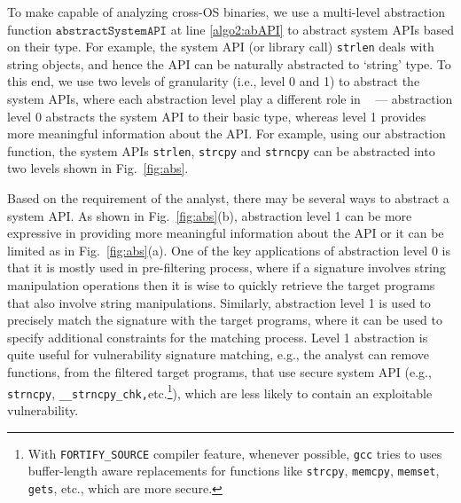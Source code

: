 To make \tool capable of analyzing cross-OS binaries, we use a multi-level abstraction function $\mathtt{abstractSystemAPI}$ at line \ref{algo2:abAPI} to abstract system APIs based on their type. For example, the system API (or library call) \texttt{strlen} deals with string objects, and hence  the API can be naturally abstracted to `string' type. To this end, we use two levels of granularity (i.e., level 0 and 1) to abstract the system APIs, where each abstraction level play a different role in \tool~ --- abstraction level 0 abstracts the system API to their basic type, whereas level 1 provides more meaningful information about the API. For example, using our abstraction function, the system APIs \texttt{strlen}, \texttt{strcpy} and \texttt{strncpy} can be abstracted into two levels shown in Fig.~\ref{fig:abs}.


Based on the requirement of the analyst, there may be several ways to abstract a system API. As shown in Fig.~\ref{fig:abs}(b), abstraction level 1 can be more expressive in providing more meaningful information about the API or it can be limited as in Fig.~\ref{fig:abs}(a). One of the key applications of abstraction level 0 is that it is mostly used in pre-filtering process, where if a signature involves string manipulation operations then it is wise to quickly retrieve the target programs that also involve string manipulations. Similarly, abstraction level 1 is used to precisely match the signature with the target programs, where it can be used to specify additional constraints for the matching process. Level 1 abstraction is quite useful for vulnerability signature matching, e.g., the analyst can remove functions, from the filtered target programs, that use secure system API (e.g., \texttt{strncpy}, \texttt{\_\_strncpy\_chk,}etc.\footnote{With \texttt{FORTIFY\_SOURCE} compiler feature, whenever possible, \texttt{gcc} tries to uses buffer-length aware replacements for functions like \texttt{strcpy}, \texttt{memcpy}, \texttt{memset}, \texttt{gets}, etc., which are more secure.}), which are less likely to contain an exploitable vulnerability.

